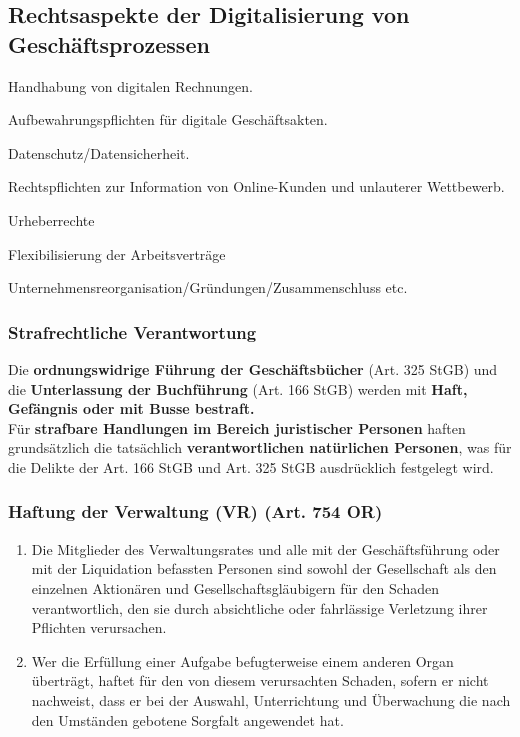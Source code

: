 \subsection{Rechtsaspekte der Digitalisierung von Geschäftsprozessen}
\begin{description}
	\tightlist
	\item[EIDI-V] Handhabung von digitalen Rechnungen.
	\item[GeBüV] Aufbewahrungspflichten für digitale Geschäftsakten.
	\item[DSG/DSGVO] Datenschutz/Datensicherheit.
	\item[UWG] Rechtspflichten zur Information von Online-Kunden und
	unlauterer Wettbewerb.
	\item[URG] Urheberrechte
	\item[OR/ArG] Flexibilisierung der Arbeitsverträge
	\item[OR/FusG] Unternehmensreorganisation/Gründungen/Zusammenschluss etc.
\end{description}

\subsubsection{Strafrechtliche Verantwortung}
\label{sec:DigiTrans-Strafrecht}
Die \textbf{ordnungswidrige Führung der Geschäftsbücher}
(Art. 325 StGB) und die \textbf{Unterlassung der Buchführung}
(Art. 166 StGB) werden mit \textbf{Haft, Gefängnis oder mit Busse bestraft.}\\
Für \textbf{strafbare Handlungen im Bereich juristischer Personen}
haften grundsätzlich die tatsächlich \textbf{verantwortlichen
natürlichen Personen}, was für die Delikte der Art. 166 StGB
und Art. 325 StGB ausdrücklich festgelegt wird.

\subsubsection{Haftung der Verwaltung (VR) (Art. 754 OR)}
\label{sec:DigiTrans-VR}

\begin{enumerate}
	\tightlist
	\item Die Mitglieder des Verwaltungsrates und alle mit der Geschäftsführung
	oder mit der Liquidation befassten Personen sind sowohl der Gesellschaft als
	den einzelnen Aktionären und Gesellschaftsgläubigern für den Schaden
	verantwortlich, den sie durch absichtliche oder fahrlässige Verletzung ihrer
	Pflichten verursachen.
	\item Wer die Erfüllung einer Aufgabe befugterweise einem anderen Organ
	überträgt, haftet für den von diesem verursachten Schaden, sofern er nicht
	nachweist, dass er bei der Auswahl, Unterrichtung und Überwachung die nach
	den Umständen gebotene Sorgfalt angewendet hat.
\end{enumerate}

